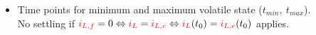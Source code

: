 {\begin{itemize}
\begin{align*}
        &= L \cdot \left( \frac{R_1}{R_2} + 1 \right) \cdot \dt\, \eci{i_L} + R_1 \cdot \eci{i_L} \qquad \bigg| \cdot \frac{1}{R_1}\\
        \frac{\ecv{u_1}}{R_1} &= \underbrace{L \cdot \left( \frac{1}{R_1} + \frac{1}{R_2} \right)}_{\ =\tau} \cdot \dt\, \eci{i_L} + \eci{i_L}\\ 
        \tau &= L \cdot \left( \frac{1}{R_1} + \frac{1}{R_2} \right) = \frac{L}{R_1||R_2}
    \end{align*}
    \item[c)] Time points for minimum and maximum volatile state ($t_{min},\ t_{max}$). \\
    No settling if 
    ${\color{red}i_{L,f}}=0 \Leftrightarrow {\color{red}i_L}={\color{red}i_{L,e}} \Leftrightarrow {\color{red}i_L}(t_0)={\color{red}i_{L,e}}(t_0)$ applies. \\
    

\end{itemize}}
